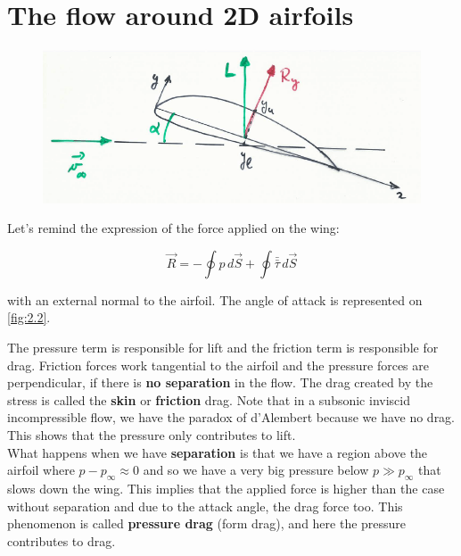 		 \newpage
		 
	\section{The flow around 2D airfoils}
		
		\begin{figure}
		\vspace{-5mm}
		\includegraphics[scale=0.25]{ch2/3}
		\label{fig:2.2}
		\end{figure}
		Let's remind the expression of the force applied on the wing:
		
		\begin{equation}
		\vec{R} = -\oint p \, d\vec{S} + \oint \bar{\bar{\tau}} \, d\vec{S} 
		\end{equation}
		
		with an external normal to the airfoil. The angle of attack is represented on \autoref{fig:2.2}.

		The pressure term is responsible for lift and the friction term is responsible for drag. Friction forces work tangential to the airfoil and the pressure forces are perpendicular, if there is \textbf{no separation} in the flow. The drag created by the stress is called the \textbf{skin} or \textbf{friction} drag. 
		Note that in a subsonic inviscid incompressible flow, we have the paradox of d’Alembert because we have no drag. This shows that the pressure only contributes to lift. \\

		What happens when we have \textbf{separation} is that we have a region above the airfoil where $p-p_\infty \approx 0$ and so we have a very big pressure below $p\gg p_\infty$ that slows down the wing. This implies that the applied force is higher than the case without separation and due to the attack angle, the drag force too. This phenomenon is called \textbf{pressure drag} (form drag), and here the pressure contributes to drag.
		
